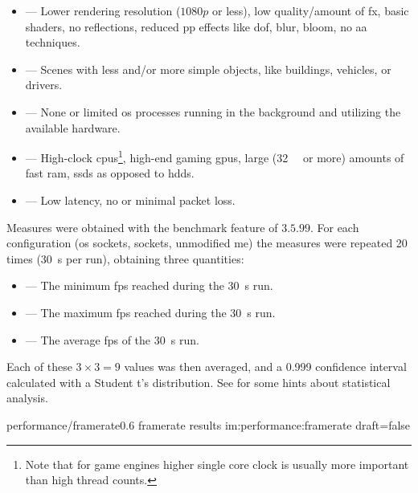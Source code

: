 \begin{itemize}
	\item {} --- Lower rendering resolution ($1080p$ or less), low quality/amount of \gls{fx}, basic shaders, no reflections, reduced \gls{pp} effects like \gls{dof}, blur, bloom, no \gls{aa} techniques.
	\item {} --- Scenes with less and/or more simple objects, like buildings, vehicles, or drivers.
	\item {} --- None or limited \gls{os} processes running in the background and utilizing the available hardware.
	\item {} --- High-clock \glspl{cpu}\footnote{Note that for game engines higher single core clock is usually more important than high thread counts.}, high-end gaming \glspl{gpu}, large (\SI{32}{\giga\byte} or more) amounts of fast \gls{ram}, \glspl{ssd} as opposed to \glspl{hdd}.
	\item {} --- Low latency, no or minimal packet loss.
\end{itemize}

Measures were obtained with the benchmark feature of  $3.5.99$. For each configuration (\gls{os} sockets,  sockets, unmodified \gls{me}) the measures were repeated \num{20} times (\SI{30}{\second} per run), obtaining three quantities:

\begin{itemize}
	\item {} --- The minimum \gls{fps} reached during the \SI{30}{\second} run.
	\item {} --- The maximum \gls{fps} reached during the \SI{30}{\second} run.
	\item {} --- The average \gls{fps} of the \SI{30}{\second} run.
\end{itemize}

\FLOATnoindent Each of these $3\times3=9$ values was then averaged, and a \num{0,999} confidence interval calculated with a Student t's distribution. See  for some hints about statistical analysis.

\begin{image}
	{performance/framerate}{0.6}
	{framerate results}
	{im:performance:framerate}
	{draft=false}
\end{image} %


